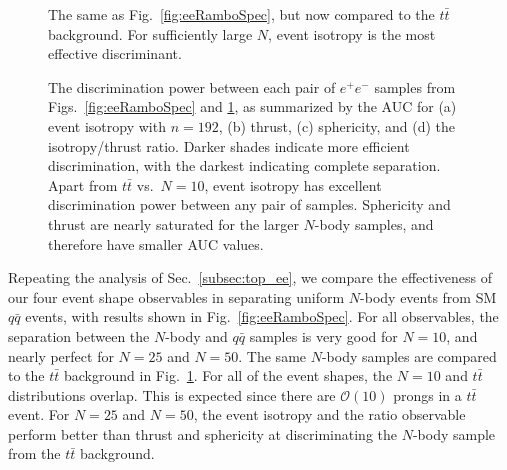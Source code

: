 \documentclass[letterpaper,11pt]{article}
\DeclareRobustCommand{\Sec}[1]{Sec.~\ref{#1}}
\DeclareRobustCommand{\Fig}[1]{Fig.~\ref{#1}}
\DeclareRobustCommand{\Figs}[2]{Figs.~\ref{#1} and \ref{#2}}
\begin{document}
\begin{figure}[t!]
%
     \hfill
      \hfill
      \hfill
\caption{The same as \Fig{fig:eeRamboSpec}, but now compared to the $t\bar{t}$ background.
%
For sufficiently large $N$, event isotropy is the most effective discriminant. }
%
\label{fig:eeRambottSpec}
\end{figure}

\begin{figure}[t!]
%
     \hfill
      \hfill
      \hfill
\caption{The discrimination power between each pair of $e^+ e^-$ samples from \Figs{fig:eeRamboSpec}{fig:eeRambottSpec}, as summarized by the AUC for (a) event isotropy with $n = 192$, (b) thrust, (c) sphericity, and (d) the isotropy/thrust ratio. 
%
Darker shades indicate more efficient discrimination, with the darkest indicating complete separation.
%
Apart from $t\bar{t}$ vs.\ $N = 10$, event isotropy has excellent discrimination power between any pair of samples.
%
Sphericity and thrust are nearly saturated for the larger $N$-body samples, and therefore have smaller AUC values.}
%
\label{fig:eeAUCtabs}
\end{figure}

Repeating the analysis of \Sec{subsec:top_ee}, we compare the effectiveness of our four event shape observables in separating uniform $N$-body events from SM $q\bar{q}$ events, with results shown in \Fig{fig:eeRamboSpec}. 
%
For all observables, the separation between the $N$-body and $q\bar{q}$ samples is very good for $N = 10$, and nearly perfect for $N = 25$ and $N = 50$. 
%
The same $N$-body samples are compared to the $t\bar{t}$ background in \Fig{fig:eeRambottSpec}.
%
For all of the event shapes, the $N=10$ and $t\bar{t}$ distributions overlap. 
%
This is expected since there are $\mathcal{O}(10)$ prongs in a $t\bar{t}$ event.
%
For $N=25$ and $N=50$, the event isotropy and the ratio observable perform better than thrust and sphericity at discriminating the $N$-body sample from the $t\bar{t}$ background.
\end{document}
